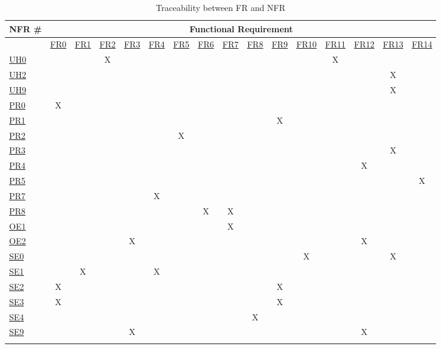 \documentclass[12pt]{article}
\begin{document}
\setlength\LTleft{-2cm}
\begin{longtable}{l|ccccccccccccccc}

NFR \# & \multicolumn{15}{c}{Functional Requirement} \\ \hline
\endfirsthead
%
\endhead
%
 & \hyperref[sec:FR0]{FR0} & \hyperref[sec:FR1]{FR1} & \hyperref[sec:FR2]{FR2} & \hyperref[sec:FR3]{FR3} & \hyperref[sec:FR4]{FR4} & \hyperref[sec:FR5]{FR5} & \hyperref[sec:FR6]{FR6} & \hyperref[sec:FR7]{FR7} & \hyperref[sec:FR8]{FR8} & \hyperref[sec:FR9]{FR9} & \hyperref[sec:FR10]{FR10} & \hyperref[sec:FR11]{FR11} & \hyperref[sec:FR12]{FR12} & \hyperref[sec:FR13]{FR13} & \hyperref[sec:FR14]{FR14} \\
\hyperref[sec:UH0]{UH0} &  &  & X &  &  &  &  &  &  &  &  & X &  &  &  \\
\hyperref[sec:UH2]{UH2} &  &  &  &  &  &  &  &  &  &  &  &  &  & X &  \\
\hyperref[sec:UH9]{UH9} &  &  &  &  &  &  &  &  &  &  &  &  &  & X &  \\
\hyperref[sec:PR0]{PR0} & X &  &  &  &  &  &  &  &  &  &  &  &  &  &  \\
\hyperref[sec:PR1]{PR1} &  &  &  &  &  &  &  &  &  & X &  &  &  &  &  \\
\hyperref[sec:PR2]{PR2} &  &  &  &  &  & X &  &  &  &  &  &  &  &  &  \\
\hyperref[sec:PR3]{PR3} &  &  &  &  &  &  &  &  &  &  &  &  &  & X &  \\
\hyperref[sec:PR4]{PR4} &  &  &  &  &  &  &  &  &  &  &  &  & X &  &  \\
\hyperref[sec:PR5]{PR5} &  &  &  &  &  &  &  &  &  &  &  &  &  &  & X \\
\hyperref[sec:PR7]{PR7} &  &  &  &  & X &  &  &  &  &  &  &  &  &  &  \\
\hyperref[sec:PR8]{PR8} &  &  &  &  &  &  & X & X &  &  &  &  &  &  &  \\
\hyperref[sec:OE1]{OE1} &  &  &  &  &  &  &  & X &  &  &  &  &  &  &  \\
\hyperref[sec:OE2]{OE2} &  &  &  & X &  &  &  &  &  &  &  &  & X &  &  \\
\hyperref[sec:SE0]{SE0} &  &  &  &  &  &  &  &  &  &  & X &  &  & X &  \\
\hyperref[sec:SE1]{SE1} &  & X &  &  & X &  &  &  &  &  &  &  &  &  &  \\
\hyperref[sec:SE2]{SE2} & X &  &  &  &  &  &  &  &  & X &  &  &  &  &  \\
\hyperref[sec:SE3]{SE3} & X &  &  &  &  &  &  &  &  & X &  &  &  &  &  \\
\hyperref[sec:SE4]{SE4} &  &  &  &  &  &  &  &  & X &  &  &  &  &  &  \\
\hyperref[sec:SE9]{SE9} &  &  &  & X &  &  &  &  &  &  &  &  & X &  & \\
\caption{Traceability between FR and NFR} \\
\end{longtable}
\end{document}
